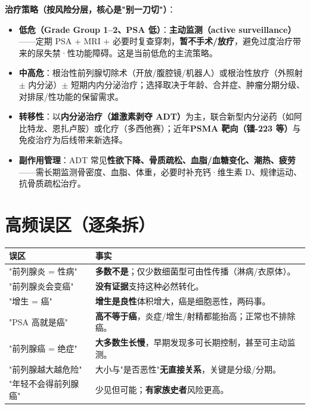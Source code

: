 \documentclass[12pt,UTF8,openany]{ctexbook}
\begin{document}
\textbf{治疗策略（按风险分层，核心是"别一刀切"）}：
\begin{itemize}[leftmargin=2em,itemsep=0.3em]
  \item \textbf{低危（Grade Group 1--2、PSA 低）}：\textbf{主动监测（active surveillance）}——定期 PSA + MRI + 必要时复查穿刺，\textbf{暂不手术/放疗}，避免过度治疗带来的尿失禁·性功能障碍。这是当前低危的主流策略。
  \item \textbf{中高危}：根治性前列腺切除术（开放/腹腔镜/机器人）或根治性放疗（外照射 $\pm$ 内分泌）$\pm$ 短期内内分泌治疗；选择取决于年龄、合并症、肿瘤分期分级、对排尿/性功能的保留需求。
  \item \textbf{转移性}：以\textbf{内分泌治疗（雄激素剥夺 ADT）}为主，联合新型内分泌药（如阿比特龙、恩扎卢胺）或化疗（多西他赛）；近年\textbf{PSMA 靶向（镭-223 等）}与免疫治疗为后线带来新选择。
  \item \textbf{副作用管理}：ADT 常见\textbf{性欲下降、骨质疏松、血脂/血糖变化、潮热、疲劳}——需长期监测骨密度、血脂、体重，必要时补充钙·维生素 D、规律运动、抗骨质疏松治疗。
\end{itemize}

\section{高频误区（逐条拆）}

\begin{tabularx}{\textwidth}{l X}
\toprule
\textbf{误区} & \textbf{事实} \\
\midrule
"前列腺炎 = 性病" & \textbf{多数不是}；仅少数细菌型可由性传播（淋病/衣原体）。 \\
"前列腺炎会变癌" & \textbf{没有证据}支持这种必然转化。 \\
"增生 = 癌" & \textbf{增生是良性}体积增大，癌是细胞恶性，两码事。 \\
"PSA 高就是癌" & \textbf{高不等于癌}，炎症/增生/射精都能抬高；正常也不排除癌。 \\
"前列腺癌 = 绝症" & \textbf{大多数生长慢}，早期发现多可长期控制，甚至可主动监测。 \\
"前列腺越大越危险" & 大小与"是否恶性"\textbf{无直接关系}，关键是分级/分期。 \\
"年轻不会得前列腺癌" & 少见但可能；\textbf{有家族史者}风险更高。 \\
\bottomrule
\end{tabularx}
\end{document}
